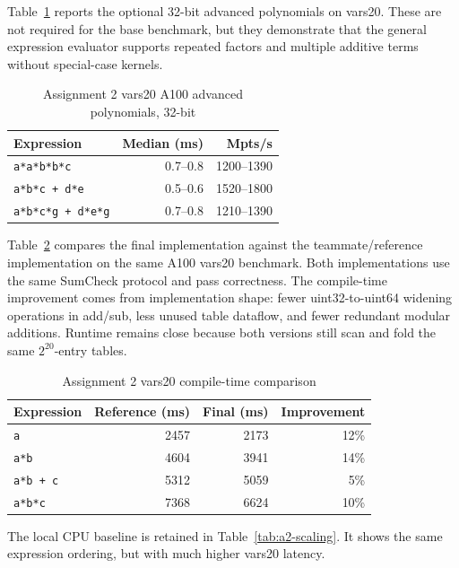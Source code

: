 \documentclass[conference]{IEEEtran}
\begin{document}
Table~\ref{tab:a2-advanced} reports the optional 32-bit advanced polynomials
on vars20. These are not required for the base benchmark, but they demonstrate
that the general expression evaluator supports repeated factors and multiple
additive terms without special-case kernels.

\begin{table}[htbp]
\caption{Assignment 2 vars20 A100 advanced polynomials, 32-bit}
\label{tab:a2-advanced}
\centering
\footnotesize
\setlength{\tabcolsep}{4pt}
\begin{tabular}{@{}lrr@{}}
\toprule
Expression & Median (ms) & Mpts/s \\
\midrule
\texttt{a*a*b*b*c}       & 0.7--0.8 & 1200--1390 \\
\texttt{a*b*c + d*e}     & 0.5--0.6 & 1520--1800 \\
\texttt{a*b*c*g + d*e*g} & 0.7--0.8 & 1210--1390 \\
\bottomrule
\end{tabular}
\end{table}

Table~\ref{tab:a2-compile} compares the final implementation against the
teammate/reference implementation on the same A100 vars20 benchmark. Both
implementations use the same SumCheck protocol and pass correctness. The
compile-time improvement comes from implementation shape: fewer uint32-to-uint64
widening operations in add/sub, less unused table dataflow, and fewer redundant
modular additions. Runtime remains close because both versions still scan and
fold the same $2^{20}$-entry tables.

\begin{table}[htbp]
\caption{Assignment 2 vars20 compile-time comparison}
\label{tab:a2-compile}
\centering
\footnotesize
\setlength{\tabcolsep}{3pt}
\begin{tabular}{@{}lrrr@{}}
\toprule
Expression & Reference (ms) & Final (ms) & Improvement \\
\midrule
\texttt{a}       & 2457 & 2173 & 12\% \\
\texttt{a*b}     & 4604 & 3941 & 14\% \\
\texttt{a*b + c} & 5312 & 5059 & 5\% \\
\texttt{a*b*c}   & 7368 & 6624 & 10\% \\
\bottomrule
\end{tabular}
\end{table}

The local CPU baseline is retained in Table~\ref{tab:a2-scaling}. It shows the
same expression ordering, but with much higher vars20 latency.
\end{document}
